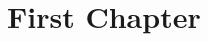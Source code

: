 \documentclass[working]{tuftebook}
\begin{document}
\chapter{First Chapter}
\renewcommand{\thepage}{\arabic{page}}
\pagestyle{plain}
\pagestyle{normal}
\vspace{-2em}
\end{document}
